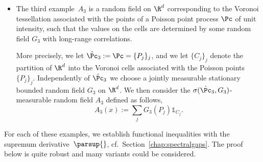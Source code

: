 \begin{itemize}
\item The third example~$A_3$ is a random field on $\R^d$ corresponding to the Voronoi tessellation associated with the points of a Poisson point process $\Pc$ of unit intensity, such that the values on the cells are determined by some random field $G_3$ with long-range correlations.


More precisely, we let $\hat\Pc_3:=\Pc=\{P_j\}_j$, and we let $\{C_j\}_j$ denote the partition of $\R^d$ into the Voronoi cells associated with the Poisson points $\{P_j\}_j$. Independently of $\hat\Pc_3$ we choose a jointly measurable stationary bounded random field $G_3$ on $\R^d$. We then consider the $\sigma(\hat\Pc_3,G_3)$-measurable random field $A_3$ defined as follows,
\[
A_3(x):=\sum_jG_3(P_j)\mathds1_{C_j}.
\]
\end{itemize}

For each of these examples, we establish functional inequalities with the supremum derivative~$\parsup{}$, cf.~Section~\ref{chap:spectralgaps}. The proof below is quite robust and many variants could be considered.

